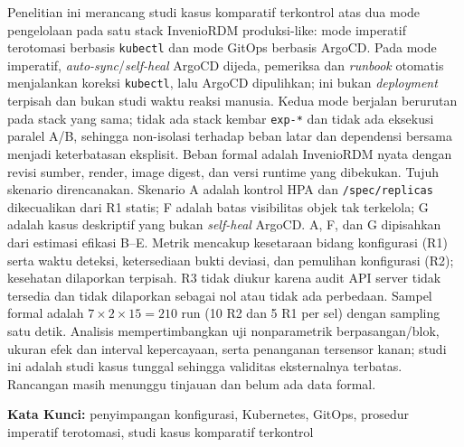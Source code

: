 \documentclass[proposal,indonesia]{ugmskripsi}
\begin{document}
\sloppy

\cover
\titlepageind
\approvalpage

\tableofcontents

\abstractind
Penelitian ini merancang studi kasus komparatif terkontrol atas dua mode pengelolaan pada satu stack InvenioRDM produksi-like: mode imperatif terotomasi berbasis \texttt{kubectl} dan mode GitOps berbasis ArgoCD. Pada mode imperatif, \textit{auto-sync}/\textit{self-heal} ArgoCD dijeda, pemeriksa dan \textit{runbook} otomatis menjalankan koreksi \texttt{kubectl}, lalu ArgoCD dipulihkan; ini bukan \textit{deployment} terpisah dan bukan studi waktu reaksi manusia. Kedua mode berjalan berurutan pada stack yang sama; tidak ada stack kembar \texttt{exp-*} dan tidak ada eksekusi paralel A/B, sehingga non-isolasi terhadap beban latar dan dependensi bersama menjadi keterbatasan eksplisit. Beban formal adalah InvenioRDM nyata dengan revisi sumber, render, image digest, dan versi runtime yang dibekukan. Tujuh skenario direncanakan. Skenario A adalah kontrol HPA dan \texttt{/spec/replicas} dikecualikan dari R1 statis; F adalah batas visibilitas objek tak terkelola; G adalah kasus deskriptif yang bukan \textit{self-heal} ArgoCD. A, F, dan G dipisahkan dari estimasi efikasi B--E. Metrik mencakup kesetaraan bidang konfigurasi (R1) serta waktu deteksi, ketersediaan bukti deviasi, dan pemulihan konfigurasi (R2); kesehatan dilaporkan terpisah. R3 tidak diukur karena audit API server tidak tersedia dan tidak dilaporkan sebagai nol atau tidak ada perbedaan. Sampel formal adalah $7 \times 2 \times 15 = 210$ run (10 R2 dan 5 R1 per sel) dengan sampling satu detik. Analisis mempertimbangkan uji nonparametrik berpasangan/blok, ukuran efek dan interval kepercayaan, serta penanganan tersensor kanan; studi ini adalah studi kasus tunggal sehingga validitas eksternalnya terbatas. Rancangan masih menunggu tinjauan dan belum ada data formal.

\vspace{0.5cm}
\noindent\textbf{Kata Kunci:} penyimpangan konfigurasi, Kubernetes, GitOps, prosedur imperatif terotomasi, studi kasus komparatif terkontrol
\endabstractind
\end{document}
